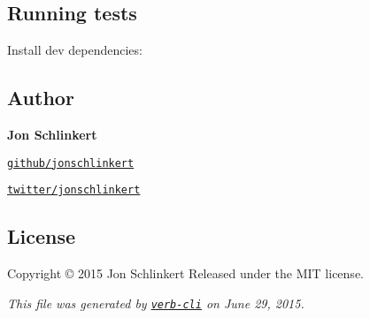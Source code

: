 \subsection*{Running tests}

Install dev dependencies\+:




\subsection*{Author}

{\bfseries Jon Schlinkert}


\begin{DoxyItemize}
\item \href{https://github.com/jonschlinkert}{\tt github/jonschlinkert}
\item \href{http://twitter.com/jonschlinkert}{\tt twitter/jonschlinkert}
\end{DoxyItemize}

\subsection*{License}

Copyright © 2015 Jon Schlinkert Released under the M\+IT license.





{\itshape This file was generated by \href{https://github.com/assemble/verb-cli}{\tt verb-\/cli} on June 29, 2015.} 